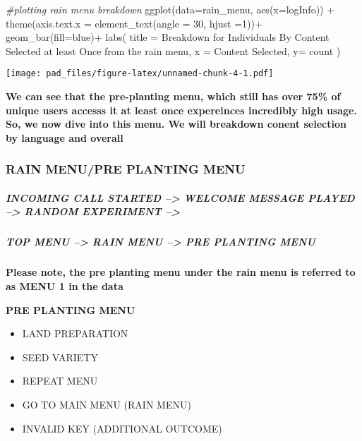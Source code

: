\documentclass[
]{article}
\newenvironment{Shaded}{\begin{snugshade}}{\end{snugshade}}
\newcommand{\AttributeTok}[1]{\textcolor[rgb]{0.77,0.63,0.00}{#1}}
\newcommand{\CommentTok}[1]{\textcolor[rgb]{0.56,0.35,0.01}{\textit{#1}}}
\newcommand{\DecValTok}[1]{\textcolor[rgb]{0.00,0.00,0.81}{#1}}
\newcommand{\FunctionTok}[1]{\textcolor[rgb]{0.00,0.00,0.00}{#1}}
\newcommand{\NormalTok}[1]{#1}
\newcommand{\SpecialCharTok}[1]{\textcolor[rgb]{0.00,0.00,0.00}{#1}}
\newcommand{\StringTok}[1]{\textcolor[rgb]{0.31,0.60,0.02}{#1}}
\providecommand{\tightlist}{%
  \setlength{\itemsep}{0pt}\setlength{\parskip}{0pt}}
\begin{document}
\begin{Shaded}
\begin{Highlighting}[]
\CommentTok{\#plotting rain menu breakdown}
\FunctionTok{ggplot}\NormalTok{(}\AttributeTok{data=}\NormalTok{rain\_menu, }\FunctionTok{aes}\NormalTok{(}\AttributeTok{x=}\NormalTok{logInfo)) }\SpecialCharTok{+}
  \FunctionTok{theme}\NormalTok{(}\AttributeTok{axis.text.x =} \FunctionTok{element\_text}\NormalTok{(}\AttributeTok{angle =} \DecValTok{30}\NormalTok{, }\AttributeTok{hjust =}\DecValTok{1}\NormalTok{))}\SpecialCharTok{+}
  \FunctionTok{geom\_bar}\NormalTok{(}\AttributeTok{fill=}\StringTok{\textquotesingle{}blue\textquotesingle{}}\NormalTok{)}\SpecialCharTok{+}
  \FunctionTok{labs}\NormalTok{(}
    \AttributeTok{title =} \StringTok{\textquotesingle{}Breakdown for Individuals By Content Selected at least Once from the rain menu\textquotesingle{}}\NormalTok{,}
    \AttributeTok{x =} \StringTok{\textquotesingle{}Content Selected\textquotesingle{}}\NormalTok{,}
    \AttributeTok{y=} \StringTok{\textquotesingle{}count\textquotesingle{}}
\NormalTok{  )}
\end{Highlighting}
\end{Shaded}

\texttt{[image: pad\_files/figure-latex/unnamed-chunk-4-1.pdf]}

\textbf{We can see that the pre-planting menu, which still has over 75\%
of unique users accesss it at least once expereinces incredibly high
usage. So, we now dive into this menu. We will breakdown conent
selection by language and overall}

\hypertarget{rain-menupre-planting-menu}{%
\subsubsection{RAIN MENU/PRE PLANTING
MENU}\label{rain-menupre-planting-menu}}

\hypertarget{incoming-call-started-welcome-message-played-random-experiment}{%
\subparagraph{INCOMING CALL STARTED --\textgreater{} WELCOME MESSAGE
PLAYED --\textgreater{} RANDOM EXPERIMENT
--\textgreater{}}\label{incoming-call-started-welcome-message-played-random-experiment}}

\hypertarget{top-menu-rain-menu-pre-planting-menu}{%
\subparagraph{TOP MENU --\textgreater{} RAIN MENU --\textgreater{} PRE
PLANTING MENU}\label{top-menu-rain-menu-pre-planting-menu}}

\textbf{Please note, the pre planting menu under the rain menu is
referred to as MENU 1 in the data}

\textbf{PRE PLANTING MENU}

\begin{itemize}
\tightlist
\item
  LAND PREPARATION
\item
  SEED VARIETY
\item
  REPEAT MENU
\item
  GO TO MAIN MENU (RAIN MENU)
\item
  INVALID KEY (ADDITIONAL OUTCOME)
\end{itemize}
\end{document}
